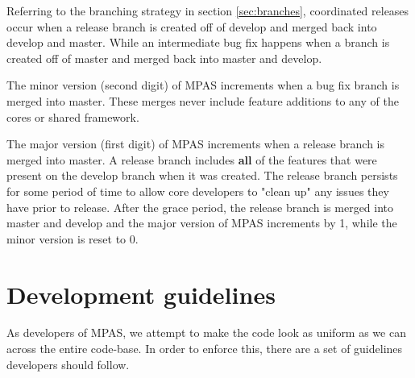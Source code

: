 \documentclass[11pt]{report}
\begin{document}
Referring to the branching strategy in section \ref{sec:branches}, coordinated
releases occur when a release branch is created off of develop and merged back
into develop and master. While an intermediate bug fix happens when a branch is
created off of master and merged back into master and develop.

The minor version (second digit) of MPAS increments when a bug fix branch is
merged into master. These merges never include feature additions to any of the
cores or shared framework.

The major version (first digit) of MPAS increments when a release branch is
merged into master. A release branch includes {\bf all} of the features that
were present on the develop branch when it was created. The release branch
persists for some period of time to allow core developers to "clean up" any
issues they have prior to release. After the grace period, the release branch
is merged into master and develop and the major version of MPAS increments by
1, while the minor version is reset to 0.

\chapter{Development guidelines}
\label{chap:code-guidelines}
As developers of MPAS, we attempt to make the code look as uniform as we can
across the entire code-base. In order to enforce this, there are a set of
guidelines developers should follow.
\end{document}
